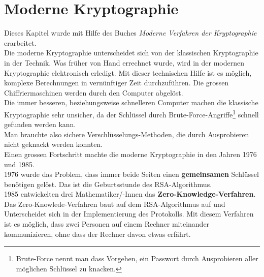 \newpage
\section{Moderne Kryptographie}
Dieses Kapitel wurde mit Hilfe des Buches \textit{Moderne Verfahren der Kryptographie} erarbeitet.\\[2ex]
Die moderne Kryptographie unterscheidet sich von der klassischen Kryptographie in der Technik. Was früher von Hand errechnet wurde, wird in der modernen Kryptographie elektronisch erledigt. Mit dieser technischen Hilfe ist es möglich, komplexe Berechnungen in vernünftiger Zeit durchzuführen. Die grossen Chiffriermaschinen werden durch den Computer abgelöst.\\
Die immer besseren, beziehungsweise schnelleren Computer machen die klassische Kryptographie sehr unsicher, da der Schlüssel durch Brute-Force-Angriffe\footnote{Brute-Force nennt man dass Vorgehen, ein Passwort durch Ausprobieren aller möglichen Schlüssel zu knacken.} schnell gefunden werden kann.\\
Man brauchte also sichere Verschlüsselungs-Methoden, die durch Ausprobieren nicht geknackt werden konnten.\\
Einen grossen Fortschritt machte die moderne Kryptographie in den Jahren 1976 und 1985.\\
1976 wurde das Problem, dass immer beide Seiten einen \textbf{gemeinsamen} Schlüssel benötigen gelöst. Das ist die Geburtsstunde des RSA-Algorithmus.\\
1985 entwickelten drei Mathematiker/-Innen das \textbf{Zero-Knowledge-Verfahren}. \cite{} Das Zero-Knowlede-Verfahren baut auf dem RSA-Algorithmus auf und Unterscheidet sich in der Implementierung des Protokolls. Mit diesem Verfahren ist es möglich, dass zwei Personen auf einem Rechner miteinander kommunizieren, ohne dass der Rechner davon etwas erfährt.
%

